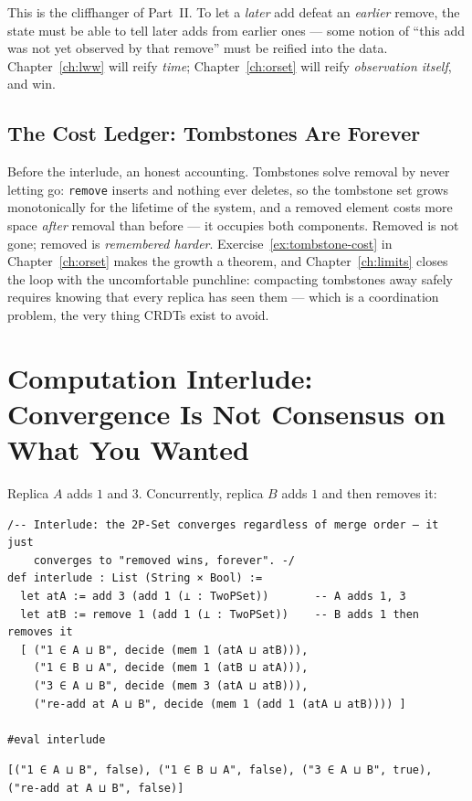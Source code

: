 \documentclass[12pt, a4paper, openright]{book}
\theoremstyle{thmstyle}
\theoremstyle{defstyle}
\newcommand{\lc}[1]{\texttt{#1}}
\begin{document}
This is the cliffhanger of Part~II. To let a \emph{later} add defeat an
\emph{earlier} remove, the state must be able to tell later adds from
earlier ones --- some notion of ``this add was not yet observed by that
remove'' must be reified into the data. Chapter~\ref{ch:lww} will reify
\emph{time}; Chapter~\ref{ch:orset} will reify \emph{observation
itself}, and win.

\subsection*{The Cost Ledger: Tombstones Are Forever}

Before the interlude, an honest accounting. Tombstones solve removal by
never letting go: \lc{remove} inserts and nothing ever deletes, so the
tombstone set grows monotonically for the lifetime of the system, and a
removed element costs more space \emph{after} removal than before ---
it occupies both components. Removed is not gone; removed is
\emph{remembered harder}. Exercise~\ref{ex:tombstone-cost} in
Chapter~\ref{ch:orset} makes the growth a theorem, and
Chapter~\ref{ch:limits} closes the loop with the uncomfortable
punchline: compacting tombstones away safely requires knowing that every
replica has seen them --- which is a coordination problem, the very
thing CRDTs exist to avoid.

\FloatBarrier
\section{Computation Interlude: Convergence Is Not Consensus on What You Wanted}

Replica $A$ adds $1$ and $3$. Concurrently, replica $B$ adds $1$ and
then removes it:

\begin{verbatim}
/-- Interlude: the 2P-Set converges regardless of merge order — it just
    converges to "removed wins, forever". -/
def interlude : List (String × Bool) :=
  let atA := add 3 (add 1 (⊥ : TwoPSet))       -- A adds 1, 3
  let atB := remove 1 (add 1 (⊥ : TwoPSet))    -- B adds 1 then removes it
  [ ("1 ∈ A ⊔ B", decide (mem 1 (atA ⊔ atB))),
    ("1 ∈ B ⊔ A", decide (mem 1 (atB ⊔ atA))),
    ("3 ∈ A ⊔ B", decide (mem 3 (atA ⊔ atB))),
    ("re-add at A ⊔ B", decide (mem 1 (add 1 (atA ⊔ atB)))) ]

#eval interlude
\end{verbatim}

\begin{verbatim}
[("1 ∈ A ⊔ B", false), ("1 ∈ B ⊔ A", false), ("3 ∈ A ⊔ B", true), ("re-add at A ⊔ B", false)]
\end{verbatim}
\end{document}
